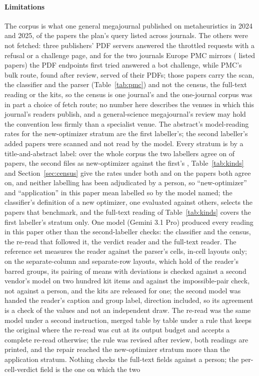 \documentclass[preprint,review,12pt]{elsarticle}
\begin{document}
\paragraph{Limitations} The corpus is what one general megajournal published on metaheuristics in 2024 and 2025, \nOListedSrep{} of the \nOListed{} papers the plan's query listed across \nOJournalsListed{} journals. The others were not fetched: three publishers' PDF servers answered the throttled requests with a refusal or a challenge page, and for the two journals Europe PMC mirrors (\nFaMirroredListed{} listed papers) the PDF endpoints first tried answered a bot challenge, while PMC's bulk route, found after review, served \nPmFetchOk{} of their PDFs; those papers carry the scan, the classifier and the parser (Table~\ref{tab:pmc}) and not the census, the full-text reading or the kits, so the census is one journal's and the one-journal corpus was in part a choice of fetch route; no number here describes the venues in which this journal's readers publish, and a general-science megajournal's review may hold the convention less firmly than a specialist venue. The abstract's model-reading rates for the new-optimizer stratum are the first labeller's; the second labeller's \nKafStDisputedToNewOptimizerPapers{} added papers were scanned and not read by the model. Every stratum is by a title-and-abstract label: over the whole corpus the two labellers agree on \nKafPctAgree{} of papers, the second files \nKafDirSecondNewOptimizer{} as new-optimizer against the first's \nKafDirFirstNewOptimizer{}, Table~\ref{tab:kinds} and Section~\ref{sec:census} give the rates under both and on the papers both agree on, and neither labelling has been adjudicated by a person, so ``new-optimizer'' and ``application'' in this paper mean labelled so by the model named; the classifier's definition of a new optimizer, one evaluated against others, selects the papers that benchmark, and the full-text reading of Table~\ref{tab:kinds} covers the first labeller's stratum only. One model (Gemini 3.1 Pro) produced every reading in this paper other than the second-labeller checks: the classifier and the census, the re-read that followed it, the verdict reader and the full-text reader. The reference set measures the reader against the parser's cells, in-cell layouts only; on the separate-column and separate-row layouts, which hold \nCrcBarredGroupsSeparateLayoutPct{} of the reader's barred groups, its pairing of means with deviations is checked against a second vendor's model on two hundred kit items and against the impossible-pair check, not against a person, and the kits are released for one; the second model was handed the reader's caption and group label, direction included, so its agreement is a check of the values and not an independent draw. The re-read was the same model under a second instruction, merged table by table under a rule that keeps the original where the re-read was cut at its output budget and accepts a complete re-read otherwise; the rule was revised after review, both readings are printed, and the repair reached the new-optimizer stratum more than the application stratum. Nothing checks the full-text fields against a person; the per-cell-verdict field is the one on which the two 
\end{document}
